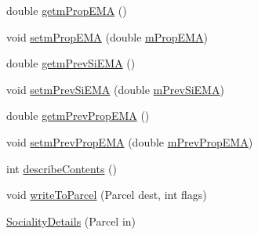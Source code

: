 \begin{DoxyCompactItemize}
\item 
double \hyperlink{classcs_1_1usense_1_1inference_module_1_1_sociality_details_ad54d9773df85c16a9777421c10278388}{getm\+Prop\+E\+M\+A} ()
\item 
void \hyperlink{classcs_1_1usense_1_1inference_module_1_1_sociality_details_ae90f1404614118000be3bc76d4eda161}{setm\+Prop\+E\+M\+A} (double \hyperlink{classcs_1_1usense_1_1inference_module_1_1_sociality_details_ad093550a5875409e710d94a2e9c32011}{m\+Prop\+E\+M\+A})
\item 
double \hyperlink{classcs_1_1usense_1_1inference_module_1_1_sociality_details_a163d67c13d60306dd1f748bb55ee95be}{getm\+Prev\+Si\+E\+M\+A} ()
\item 
void \hyperlink{classcs_1_1usense_1_1inference_module_1_1_sociality_details_a93d1ba45101bf14e26c5081b31bbdfa5}{setm\+Prev\+Si\+E\+M\+A} (double \hyperlink{classcs_1_1usense_1_1inference_module_1_1_sociality_details_a28f866785375e83e1b1a917f40299fac}{m\+Prev\+Si\+E\+M\+A})
\item 
double \hyperlink{classcs_1_1usense_1_1inference_module_1_1_sociality_details_a0849fdac022fbd625f9700d0657db7b3}{getm\+Prev\+Prop\+E\+M\+A} ()
\item 
void \hyperlink{classcs_1_1usense_1_1inference_module_1_1_sociality_details_ab0468452287b7c9f42735dc4cec7ff6c}{setm\+Prev\+Prop\+E\+M\+A} (double \hyperlink{classcs_1_1usense_1_1inference_module_1_1_sociality_details_a40f01a69da27931a3c271a948d99d452}{m\+Prev\+Prop\+E\+M\+A})
\item 
int \hyperlink{classcs_1_1usense_1_1inference_module_1_1_sociality_details_a11d23d848bd52c39bca1a0ad492ee245}{describe\+Contents} ()
\item 
void \hyperlink{classcs_1_1usense_1_1inference_module_1_1_sociality_details_adc2a2e5a3dde482f007dc840ddd2a1cc}{write\+To\+Parcel} (Parcel dest, int flags)
\item 
\hyperlink{classcs_1_1usense_1_1inference_module_1_1_sociality_details_aad4de2348002d65c2fcb40fe7fc17269}{Sociality\+Details} (Parcel in)
\end{DoxyCompactItemize}
